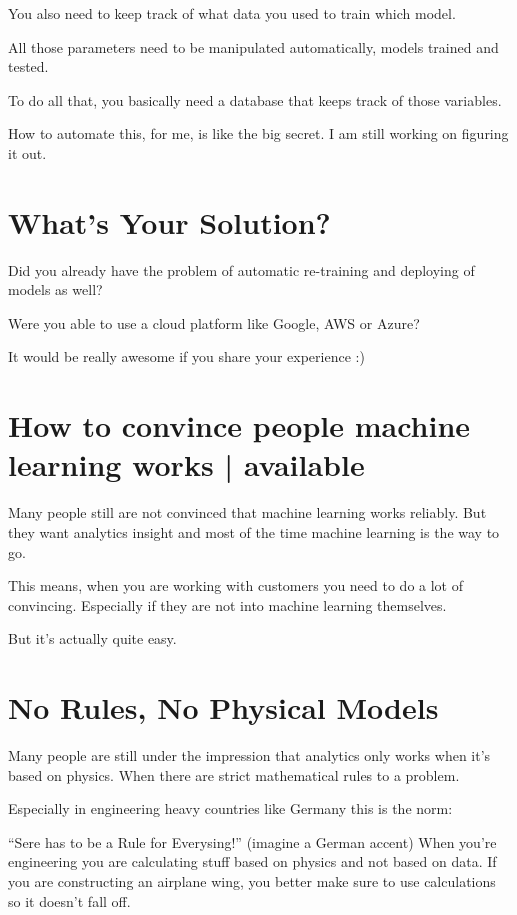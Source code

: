 \documentclass[12pt, numbers=noenddot]{scrreprt} %
\begin{document}
You also need to keep track of what data you used to train which model.

All those parameters need to be manipulated automatically, models trained and tested.

To do all that, you basically need a database that keeps track of those variables.

How to automate this, for me, is like the big secret. I am still working on figuring it out.

\section{What’s Your Solution?}

Did you already have the problem of automatic re-training and deploying of models as well?

Were you able to use a cloud platform like Google, AWS or Azure?

It would be really awesome if you share your experience :)

\section{How to convince people machine learning works | available}
Many people still are not convinced that machine learning works reliably. But they want analytics insight and most of the time machine learning is the way to go.

This means, when you are working with customers you need to do a lot of convincing. Especially if they are not into machine learning themselves.

But it's actually quite easy.

\section{No Rules, No Physical Models}

Many people are still under the impression that analytics only works when it’s based on physics. When there are strict mathematical rules to a problem.

Especially in engineering heavy countries like Germany this is the norm:

“Sere has to be a Rule for Everysing!” (imagine a German accent)
When you’re engineering you are calculating stuff based on physics and not based on data. If you are constructing an airplane wing, you better make sure to use calculations so it doesn’t fall off.
\end{document}
